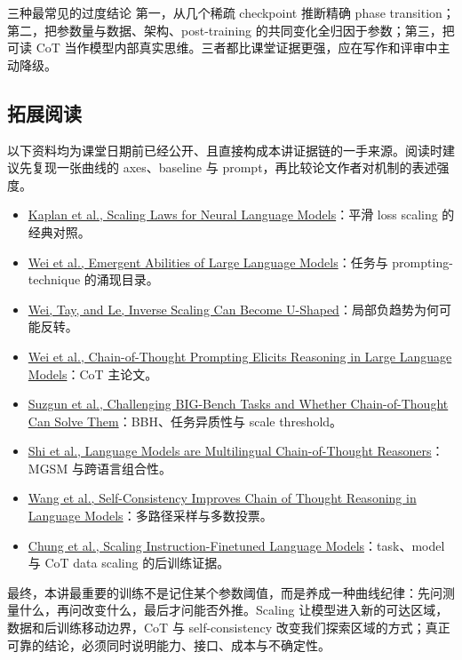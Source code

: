 \documentclass[a4paper]{article}
\begin{document}
\begin{warningbox}{三种最常见的过度结论}
第一，从几个稀疏 checkpoint 推断精确 phase transition；第二，把参数量与数据、架构、post-training 的共同变化全归因于参数；第三，把可读 CoT 当作模型内部真实思维。三者都比课堂证据更强，应在写作和评审中主动降级。
\end{warningbox}

\subsection{拓展阅读}

以下资料均为课堂日期前已经公开、且直接构成本讲证据链的一手来源。阅读时建议先复现一张曲线的 axes、baseline 与 prompt，再比较论文作者对机制的表述强度。

\begin{itemize}
  \item \href{https://arxiv.org/abs/2001.08361}{Kaplan et al., Scaling Laws for Neural Language Models}：平滑 loss scaling 的经典对照。
  \item \href{https://arxiv.org/abs/2206.07682}{Wei et al., Emergent Abilities of Large Language Models}：任务与 prompting-technique 的涌现目录。
  \item \href{https://arxiv.org/abs/2211.02011}{Wei, Tay, and Le, Inverse Scaling Can Become U-Shaped}：局部负趋势为何可能反转。
  \item \href{https://arxiv.org/abs/2201.11903}{Wei et al., Chain-of-Thought Prompting Elicits Reasoning in Large Language Models}：CoT 主论文。
  \item \href{https://arxiv.org/abs/2210.09261}{Suzgun et al., Challenging BIG-Bench Tasks and Whether Chain-of-Thought Can Solve Them}：BBH、任务异质性与 scale threshold。
  \item \href{https://arxiv.org/abs/2210.03057}{Shi et al., Language Models are Multilingual Chain-of-Thought Reasoners}：MGSM 与跨语言组合性。
  \item \href{https://arxiv.org/abs/2203.11171}{Wang et al., Self-Consistency Improves Chain of Thought Reasoning in Language Models}：多路径采样与多数投票。
  \item \href{https://arxiv.org/abs/2210.11416}{Chung et al., Scaling Instruction-Finetuned Language Models}：task、model 与 CoT data scaling 的后训练证据。
\end{itemize}

最终，本讲最重要的训练不是记住某个参数阈值，而是养成一种曲线纪律：先问测量什么，再问改变什么，最后才问能否外推。Scaling 让模型进入新的可达区域，数据和后训练移动边界，CoT 与 self-consistency 改变我们探索区域的方式；真正可靠的结论，必须同时说明能力、接口、成本与不确定性。
\end{document}
